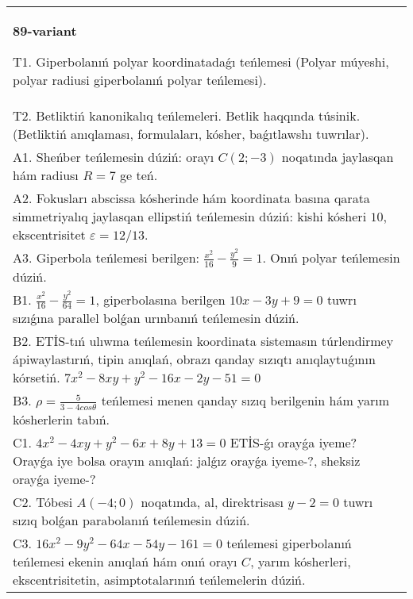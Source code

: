 \documentclass{article}
\begin{document}
\begin{tabular}{m{17cm}}
\textbf{89-variant}
\newline

T1. Giperbolanıń polyar koordinatadaǵı teńlemesi (Polyar múyeshi, polyar radiusi giperbolanıń polyar teńlemesi).\\

T2. Betliktiń kanonikalıq teńlemeleri. Betlik haqqında túsinik. (Betliktiń anıqlaması, formulaları, kósher, baǵıtlawshı tuwrılar).\\

A1. Sheńber teńlemesin dúziń: orayı $C (2;-3) $ noqatında jaylasqan hám radiusı $R=7$ ge teń.\\

A2. Fokusları abscissa kósherinde hám koordinata basına qarata simmetriyalıq jaylasqan ellipstiń teńlemesin dúziń: kishi kósheri $10$, ekscentrisitet $\varepsilon=12/13$.\\

A3. Giperbola teńlemesi berilgen: $\frac{x^{2}}{16}-\frac{y^{2}}{9}=1$. Onıń polyar teńlemesin dúziń.\\

B1. $\frac{x^{2}}{16} - \frac{y^{2}}{64} = 1$, giperbolasına berilgen $10x - 3y + 9 = 0$ tuwrı sızıǵına parallel bolǵan urınbanıń teńlemesin dúziń.  \\

B2. ETİS-tıń ulıwma teńlemesin koordinata sistemasın túrlendirmey ápiwaylastırıń, tipin anıqlań, obrazı qanday sızıqtı anıqlaytuǵının kórsetiń. $7x^{2} - 8xy + y^{2} - 16x - 2y - 51 = 0$  \\

B3. $\rho = \frac{5}{3 - 4cos\theta}$ teńlemesi menen qanday sızıq berilgenin hám yarım kósherlerin tabıń.  \\

C1. $4x^{2} - 4xy + y^{2} - 6x + 8y + 13 = 0$ ETİS-ǵı orayǵa iyeme? Orayǵa iye bolsa orayın anıqlań: jalǵız orayǵa iyeme-?, sheksiz orayǵa iyeme-?  \\

C2. Tóbesi $A(-4;0)$ noqatında, al, direktrisası $y - 2 = 0$ tuwrı sızıq bolǵan parabolanıń teńlemesin dúziń.\\

C3. $16x^{2} - 9y^{2} - 64x - 54y - 161 = 0$ teńlemesi giperbolanıń teńlemesi ekenin anıqlań hám onıń orayı $C$, yarım kósherleri, ekscentrisitetin, asimptotalarınıń teńlemelerin dúziń.  \\

\end{tabular}
\vspace{1cm}
\end{document}
